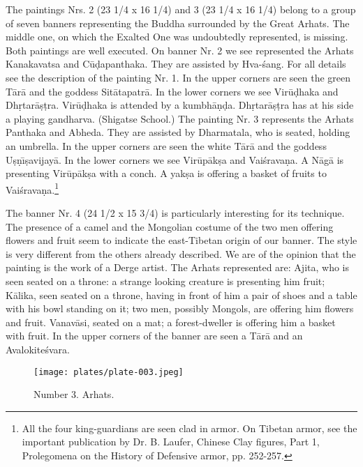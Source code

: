 \documentclass[a4paper, 12pt, oneside]{article}
\begin{document}
The paintings Nrs. 2 (23 1/4 x 16 1/4) and 3 (23 1/4 x 16 1/4) belong to a group of seven banners representing the Buddha surrounded by the Great Arhats. The middle one, on which the Exalted One was undoubtedly represented, is missing. Both paintings are well executed. On banner Nr. 2 we see represented the Arhats Kanakavatsa and C\={u}\d{d}apanthaka. They are assisted by Hva-\'{s}ang. For all details see the description of the painting Nr. 1. In the upper corners are seen the green T\={a}r\={a} and the goddess Sit\={a}tapatr\={a}. In the lower corners we see Vir\={u}\d{d}haka and Dh\d{r}tar\={a}\d{s}\d{t}ra. Vir\={u}\d{d}haka is attended by a kumbh\={a}\d{n}\d{d}a. Dh\d{r}tar\={a}\d{s}\d{t}ra has at his side a playing gandharva. (Shigatse School.) The painting Nr. 3 represents the Arhats Panthaka and Abheda. They are assisted by Dharmatala, who is seated, holding an umbrella. In the upper corners are seen the white T\={a}r\={a} and the goddess U\d{s}\d{n}\={\i}\d{s}avijay\={a}. In the lower corners we see Vir\={u}p\={a}k\d{s}a and Vai\'{s}rava\d{n}a. A N\={a}g\={a} is presenting Vir\={u}p\={a}k\d{s}a with a conch. A yak\d{s}a is offering a basket of fruits to Vai\'{s}rava\d{n}a.\footnote{All the four king-guardians are seen clad in armor. On Tibetan armor, see the important publication by Dr. B. Laufer, Chinese Clay figures, Part 1, Prolegomena on the History of Defensive armor, pp. 252-257.}

The banner Nr. 4 (24 1/2 x 15 3/4) is particularly interesting for its technique. The presence of a camel and the Mongolian costume of the two men offering flowers and fruit seem to indicate the east-Tibetan origin of our banner. The style is very different from the others already described. We are of the opinion that the painting is the work of a Derge artist. The Arhats represented are: Ajita, who is seen seated on a throne: a strange looking creature is presenting him fruit; K\={a}lika, seen seated on a throne, having in front of him a pair of shoes and a table with his bowl standing on it; two men, possibly Mongols, are offering him flowers and fruit. Vanav\={a}si, seated on a mat; a forest-dweller is offering him a basket with fruit. In the upper corners of the banner are seen a T\={a}r\={a} and an Avalokite\'{s}vara.

\clearpage
\begin{figure}[H]
\centering
\texttt{[image: plates/plate-003.jpeg]}
\caption*{Number 3. Arhats.}
\end{figure}
\clearpage
\end{document}
